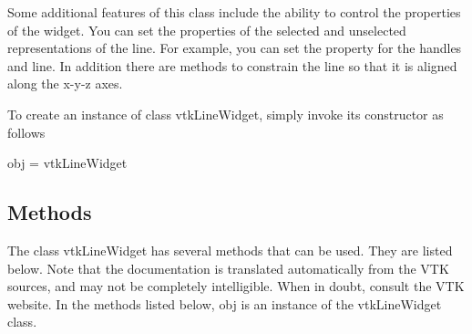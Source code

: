 Some additional features of this class include the ability to control the properties of the widget. You can set the properties of the selected and unselected representations of the line. For example, you can set the property for the handles and line. In addition there are methods to constrain the line so that it is aligned along the x-\/y-\/z axes.

To create an instance of class vtk\-Line\-Widget, simply invoke its constructor as follows \begin{DoxyVerb}  obj = vtkLineWidget
\end{DoxyVerb}
 \hypertarget{vtkwidgets_vtkxyplotwidget_Methods}{}\subsection{Methods}\label{vtkwidgets_vtkxyplotwidget_Methods}
The class vtk\-Line\-Widget has several methods that can be used. They are listed below. Note that the documentation is translated automatically from the V\-T\-K sources, and may not be completely intelligible. When in doubt, consult the V\-T\-K website. In the methods listed below, {\ttfamily obj} is an instance of the vtk\-Line\-Widget class. 
